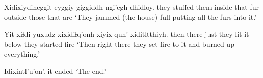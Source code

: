 \documentclass[12pt]{article}
\begin{document}
\gll Xidixiydineggit eyggiy giggiddh ngi'egh dhidloy.
{they stuffed them inside} that fur outside {those that are}
\glt `They jammed (the house) full putting all the furs into it.'
\glend

\gll Yit xiɬdi yuxudz xixidiɬq'onh xiyix {qun' xiditltthiyh.}
then there just {they lit it}  below  {they started fire}
\glt `Then right there they set fire to it and burned up everything.'
\glend

\gll Idixintl'u'on'.
{{it ended}}
\glt `The end.'
\glend



\end{document}
